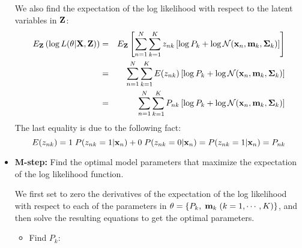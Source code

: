 \documentclass{article}
\begin{document}
\begin{itemize}
  We also find the expectation of the log likelihood with respect to 
  the latent variables in ${\bf Z}$:
  \begin{eqnarray}
    E_{\bf Z}\left( \log L(\theta|{\bf X},{\bf Z}) \right)
    &=&E_{\bf Z}\left[\sum_{n=1}^N \sum_{k=1}^K z_{nk}
    \left[\log P_k+\log {\cal N}({\bf x}_n,{\bf m}_k,{\bf\Sigma}_k)\right]\right]
    \nonumber\\
    &=&\sum_{n=1}^N \sum_{k=1}^K E(z_{nk})
    \left[\log P_k+\log {\cal N}({\bf x}_n,{\bf m}_k,{\bf\Sigma}_k)\right]
    \nonumber\\
    &=&\sum_{n=1}^N \sum_{k=1}^K P_{nk}
    \left[\log P_k+\log {\cal N}({\bf x}_n,{\bf m}_k,{\bf\Sigma}_k)\right]
    \label{expectationoflog}
  \end{eqnarray}
  The last equality is due to the following fact:
  \begin{equation}
    E(z_{nk})=1\;P(z_{nk}=1|{\bf x}_n)+0\;P(z_{nk}=0|{\bf x}_n)
    =P(z_{nk}=1|{\bf x}_n)=P_{nk}
  \end{equation}

\item {\bf M-step:} Find the optimal model parameters that maximize
  the expectation of the log likelihood function.

  We first set to zero the derivatives of the expectation of 
  the log likelihood with respect to each of the parameters in 
  ${\bf\theta}=\{P_k,\;{\bf m}_k\;(k=1,\cdots,K)\}$, and then solve
  the resulting equations to get the optimal parameters.

  \begin{itemize}
  \item Find $P_k$:
    

\end{itemize}
\end{itemize}
\end{document}
